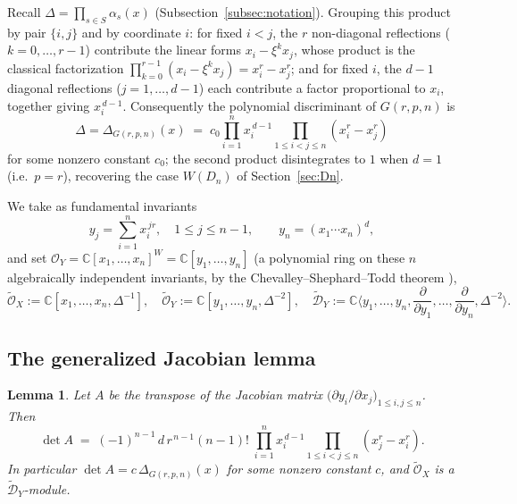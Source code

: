 \documentclass[11pt,a4paper]{article}
\newtheorem{lemma}[theorem]{Lemma}
\begin{document}
Recall $\Delta = \prod_{s \in S} \alpha_s(x)$ (Subsection~\ref{subsec:notation}).
Grouping this product by pair $\{i,j\}$ and by coordinate $i$: for
fixed $i<j$, the $r$ non-diagonal reflections ($k=0,\dots,r-1$)
contribute the linear forms $x_i - \xi^k x_j$, whose product is the
classical factorization
$\prod_{k=0}^{r-1}(x_i - \xi^k x_j) = x_i^r - x_j^r$; and for fixed
$i$, the $d-1$ diagonal reflections ($j=1,\dots,d-1$) each contribute
a factor proportional to $x_i$, together giving $x_i^{\,d-1}$.
Consequently the polynomial discriminant of $G(r,p,n)$ is
\[
 \Delta = \Delta_{G(r,p,n)}(x)
 \;=\; c_0 \prod_{i=1}^n x_i^{\,d-1} \prod_{1 \le i < j \le n} (x_i^r - x_j^r)
\]
for some nonzero constant $c_0$; the second product disintegrates to
$1$ when $d=1$ (i.e.\ $p=r$), recovering the case $W(D_n)$ of
Section~\ref{sec:Dn}.

We take as fundamental invariants
\[
 y_j = \sum_{i=1}^n x_i^{\,jr}, \quad 1 \le j \le n-1,
 \qquad
 y_n = (x_1 \cdots x_n)^d,
\]
and set $\mathcal{O}_Y = \mathbb{C}[x_1,\dots,x_n]^W = \mathbb{C}[y_1,\dots,y_n]$
(a polynomial ring on these $n$ algebraically independent invariants,
by the Chevalley--Shephard--Todd theorem \cite{Chevalley1955}),
\[
 \widetilde{\mathcal{O}}_X := \mathbb{C}[x_1,\dots,x_n,\Delta^{-1}], \quad
 \widetilde{\mathcal{O}}_Y := \mathbb{C}[y_1,\dots,y_n,\Delta^{-2}], \quad
 \widetilde{\mathcal{D}}_Y := \mathbb{C}\Big\langle y_1,\dots,y_n,
 \frac{\partial}{\partial y_1},\dots,\frac{\partial}{\partial y_n},
 \Delta^{-2}\Big\rangle .
\]

\subsection{The generalized Jacobian lemma}\label{subsec:jacobian}

\begin{lemma}\label{lem:jacobian-general}
Let $A$ be the transpose of the Jacobian matrix
$\big(\partial y_i / \partial x_j\big)_{1 \le i,j \le n}$. Then
\[
 \det A \;=\; (-1)^{n-1}\, d\, r^{\,n-1} (n-1)! \;
 \prod_{i=1}^n x_i^{\,d-1} \prod_{1 \le i < j \le n} (x_j^r - x_i^r).
\]
In particular $\det A = c \, \Delta_{G(r,p,n)}(x)$ for some nonzero
constant $c$, and $\widetilde{\mathcal{O}}_X$ is a $\widetilde{\mathcal{D}}_Y$-module.
\end{lemma}
\end{document}
